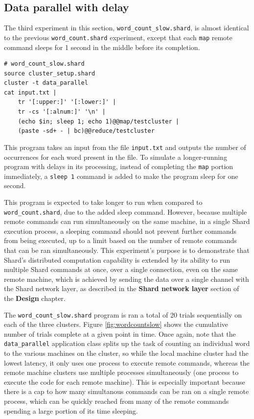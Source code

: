 \documentclass[twoside]{report}
\begin{document}
\subsection{Data parallel with delay}
The third experiment in this section, \texttt{word\_count\_slow.shard}, is almost identical to the previous \texttt{word\_count.shard} experiment, except that each \texttt{map} remote command sleeps for 1 second in the middle before its completion.

\begin{minipage}[c]{\textwidth-15pt}
  \begin{lstlisting}[language=Shard]
# word_count_slow.shard
source cluster_setup.shard
cluster -t data_parallel
cat input.txt |
    tr '[:upper:]' '[:lower:]' |
    tr -cs '[:alnum:]' '\n' |
    (echo $in; sleep 1; echo 1)@@map/testcluster |
    (paste -sd+ - | bc)@@reduce/testcluster
\end{lstlisting}
  \smallskip
\end{minipage}

This program takes an input from the file \texttt{input.txt} and outputs the number of occurrences for each word present in the file.
To simulate a longer-running program with delays in its processing, instead of completing the \texttt{map} portion immediately, a \texttt{sleep 1} command is added to make the program sleep for one second.

This program is expected to take longer to run when compared to \texttt{word\_count.shard}, due to the added sleep command.
However, because multiple remote commands can run simultaneously on the same machine, in a single Shard execution process, a sleeping command should not prevent further commands from being executed, up to a limit based on the number of remote commands that can be ran simultaneously.
This experiment's purpose is to demonstrate that Shard's distributed computation capability is extended by its ability to run multiple Shard commands at once, over a single connection, even on the same remote machine, which is achieved by sending the data over a single channel with the Shard network layer, as described in the \textbf{Shard network layer} section of the \textbf{Design} chapter.

The \texttt{word\_count\_slow.shard} program is ran a total of 20 trials sequentially on each of the three clusters. Figure \ref{fig:wordcountslow} shows the cumulative number of trials complete at a given point in time. Once again, note that the \texttt{data\_parallel} application class splits up the task of counting an individual word to the various machines on the cluster, so while the local machine cluster had the lowest latency, it only uses one process to execute remote commands, whereas the remote machine clusters use multiple processes simultaneously (one process to execute the code for each remote machine). This is especially important because there is a cap to how many simultanous commands can be ran on a single remote process, which can be quickly reached from many of the remote commands spending a large portion of its time sleeping.
\end{document}
